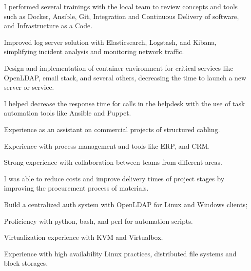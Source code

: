 \documentclass[]{deedy-resume-openfont}
\begin{document}
\begin{minipage}[t]{0.66\textwidth}
\begin{tightemize}
    \end{tightemize}
    \begin{tightemize}
    \item I performed several trainings with the local team to review concepts
        and tools such as Docker, Ansible, Git, Integration and Continuous
        Delivery of software, and Infrastructure as a Code.
    \item Improved log server solution with Elasticsearch, Logstash, and
        Kibana, simplifying incident analysis and monitoring network traffic.
    \item Design and implementation of container environment for critical
        services like OpenLDAP, email stack, and several others, decreasing the
        time to launch a new server or service.
    \item I helped decrease the response time for calls in the helpdesk with
        the use of task automation tools like Ansible and Puppet.
    \end{tightemize}
    \begin{tightemize}
    \item Experience as an assistant on commercial projects of structured
        cabling.
    \item Experience with process management and tools like ERP, and CRM.
    \item Strong experience with collaboration between teams from different
        areas.
    \item I was able to reduce costs and improve delivery times of project
        stages by improving the procurement process of materials.
    \end{tightemize}
    \begin{tightemize}
    \item Build a centralized auth system with OpenLDAP for
        Linux and Windows clients;
    \item Proficiency with python, bash, and perl for automation scripts.
    \item Virtualization experience with KVM and Virtualbox.
    \item Experience with high availability Linux practices, distributed file
        systems and block storages.
    \end{tightemize}

\end{minipage}
\end{document}
